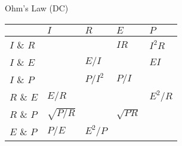 %
%
%

\begin{section}{Ohm's Law (DC)}
  \begin{tabular}{|l|l|l|l|l|}
    \hline              &  $I$      & $R$     & $E$     & $P$     \\
    \hline   $I$ \& $R$ &           &         & $IR$    &  $I^2R$ \\
    \hline   $I$ \& $E$ &           & $E/I$   &         &  $EI$   \\
    \hline   $I$ \& $P$ &           & $P/I^2$ & $P/I$   &         \\
    \hline   $R$ \& $E$ &  $E/R$    &         &         & $E^2/R$ \\
    \hline   $R$ \& $P$ & $\sqrt{P/R}$ &      & $\sqrt{PR}$ &     \\
    \hline   $E$ \& $P$ & $P/E$     & $E^2/P$ &         &         \\
    \hline
\end{tabular}
\end{section}
